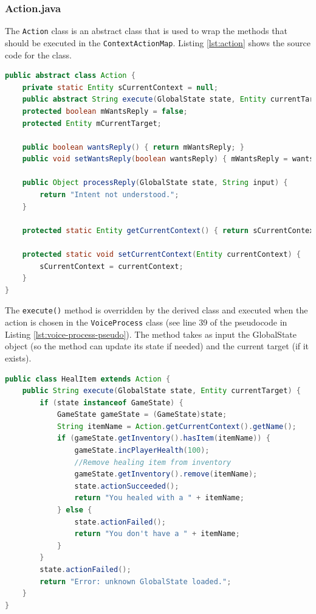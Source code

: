 \documentclass[12pt]{article}
\begin{document}
\subsubsection{Action.java}
\label{section:action}

The \texttt{Action} class is an abstract class that is used to wrap the methods that should be executed in the \texttt{ContextActionMap}. Listing \ref{lst:action} shows the source code for the class.

\begin{lstlisting}[language=Java, caption=Action.java, label={lst:action}]
public abstract class Action {
    private static Entity sCurrentContext = null;
    public abstract String execute(GlobalState state, Entity currentTarget);
    protected boolean mWantsReply = false;
    protected Entity mCurrentTarget;
    
    public boolean wantsReply() { return mWantsReply; }
    public void setWantsReply(boolean wantsReply) { mWantsReply = wantsReply; }

    public Object processReply(GlobalState state, String input) { 
        return "Intent not understood.";
    }

    protected static Entity getCurrentContext() { return sCurrentContext; }

    protected static void setCurrentContext(Entity currentContext) {
        sCurrentContext = currentContext;
    }
}
\end{lstlisting}

The \texttt{execute()} method is overridden by the derived class and executed when the action is chosen in the \texttt{VoiceProcess} class (see line 39 of the pseudocode in Listing \ref{lst:voice-process-pseudo}). The method takes as input the GlobalState object (so the method can update its state if needed) and the current target (if it exists).

\begin{lstlisting}[language=Java, caption=HealItem.java, label={lst:heal-item}]
public class HealItem extends Action {
    public String execute(GlobalState state, Entity currentTarget) {
        if (state instanceof GameState) {
            GameState gameState = (GameState)state;
            String itemName = Action.getCurrentContext().getName();
            if (gameState.getInventory().hasItem(itemName)) {
                gameState.incPlayerHealth(100);
                //Remove healing item from inventory
                gameState.getInventory().remove(itemName);
                state.actionSucceeded();
                return "You healed with a " + itemName;
            } else {
                state.actionFailed();
                return "You don't have a " + itemName;
            }
        }
        state.actionFailed();
        return "Error: unknown GlobalState loaded.";
    }
}
\end{lstlisting}
\end{document}
